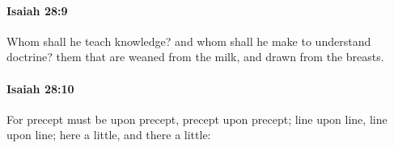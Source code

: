 		\paragraph{Isaiah 28:9} %
			\label{ISAIAH-28-9}

			Whom shall he teach knowledge? and whom shall he make to understand doctrine? them that are weaned from the milk, and drawn from the breasts.


		\paragraph{Isaiah 28:10} %
			\label{ISAIAH-28-10}

			For precept must be upon precept, precept upon precept; line upon line, line upon line; here a little, and there a little:

